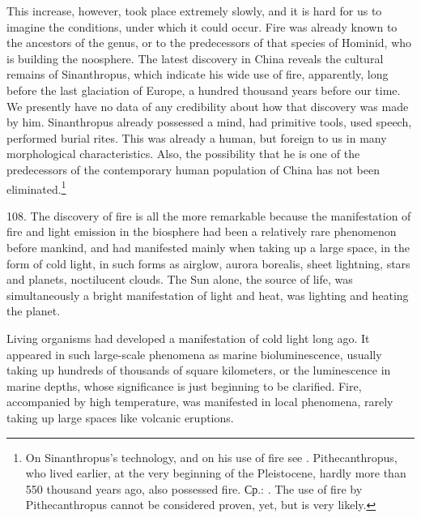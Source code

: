This increase, however, took place extremely slowly, and it is hard for us to
imagine the conditions, under which it could occur.  Fire was already known to
the ancestors of the genus, or to the predecessors of that species of Hominid,
who is building the noosphere.  The latest discovery in China reveals the
cultural remains of Sinanthropus, which indicate his wide use of fire,
apparently, long before the last glaciation of Europe, a hundred thousand
years before our time.  We presently have no data of any credibility about how
that discovery was made by him.  Sinanthropus already possessed a mind, had
primitive tools, used speech, performed burial rites.  This was already a
human, but foreign to us in many morphological characteristics.  Also, the
possibility that he is one of the predecessors of the contemporary human
population of China has not been eliminated.\footnote{
	On Sinanthropus's technology, and on his use of fire see
	\cite{bogaevsky1936tehnika-p26-27}.  Pithecanthropus, who lived
	earlier, at the very beginning of the Pleistocene, hardly more than 550
	thousand years ago, also possessed fire.  Ср.:
	\cite{bogaevsky1936tehnika-p11.67}.  The use of fire by Pithecanthropus
	cannot be considered proven, yet, but is very likely.}


108. The discovery of fire is all the more remarkable because the
manifestation of fire and light emission in the biosphere had been a
relatively rare phenomenon before mankind, and had manifested mainly when
taking up a large space, in the form of cold light, in such forms as airglow,
aurora borealis, sheet lightning, stars and planets, noctilucent clouds.  The
Sun alone, the source of life, was simultaneously a bright manifestation of
light and heat, was lighting and heating the planet.

Living organisms had developed a manifestation of cold light long ago.  It
appeared in such large-scale phenomena as marine bioluminescence, usually
taking up hundreds of thousands of square kilometers, or the luminescence in
marine depths, whose significance is just beginning to be clarified.  Fire,
accompanied by high temperature, was manifested in local phenomena, rarely
taking up large spaces like volcanic eruptions.

